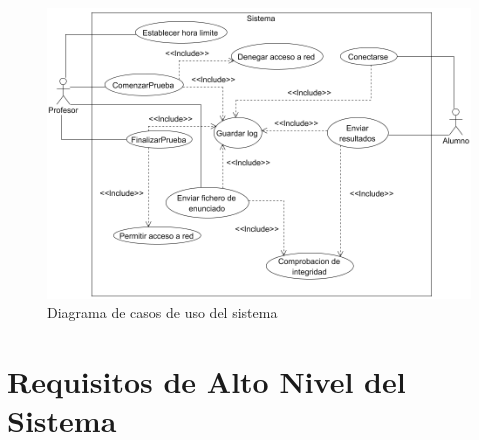 \begin{figure}[!h]
    \centering
    \includegraphics[width=\linewidth]{planificacion/casosUsoSistema2}%
    \caption{Diagrama de casos de uso del sistema}
    \label{fig:planificacion:casosUso}
\end{figure}



\section{Requisitos de Alto Nivel del Sistema}
\label{sec:planificacion:requisitos}

